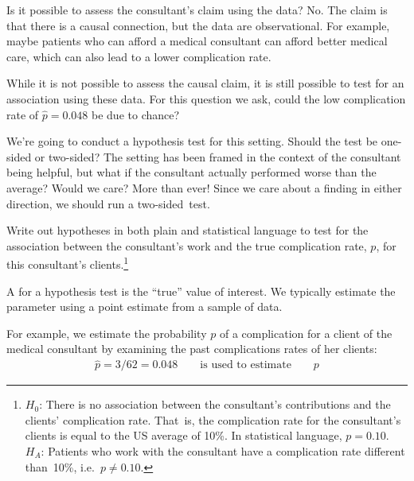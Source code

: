 \begin{example}{Is it possible to assess the consultant's claim using the data?}
No. The claim is that there is a causal connection, but the data are observational. For example, maybe patients who can afford a medical consultant can afford better medical care, which can also lead to a lower complication rate.

While it is not possible to assess the causal claim, it is still possible to test for an association using these data. For this question we ask, could the low complication rate of $\hat{p} = 0.048$ be due to chance?
\end{example}

\begin{example}{We're going to conduct a hypothesis test for this setting. Should the test be one-sided or two-sided?}
The setting has been framed in the context of the consultant being helpful, but what if the consultant actually performed worse than the average? Would we care? More than ever! Since we care about a finding in either direction, we should run a two-sided~test.
\end{example}

\begin{exercise}\label{hypForAssessingConsultantWorkInLiverTransplants}
Write out hypotheses in both plain and statistical language to test for the association between the consultant's work and the true complication rate, $p$, for this consultant's clients.\footnote{$H_0$: There is no association between the consultant's contributions and the clients' complication rate. That~is, the complication rate for the consultant's clients is equal to the US average of 10\%. In statistical language, $p=0.10$. $H_A$: Patients who work with the consultant have a complication rate different than~10\%, i.e.~$p \neq 0.10$.}
\end{exercise}

\begin{termBox}{
A  for a hypothesis test is the ``true'' value of interest. We typically estimate the parameter using a point estimate from a sample of data. \vspace{3mm}

For example, we estimate the probability $p$ of a complication for a client of the medical consultant by examining the past complications rates of her clients:\vspace{-2mm}
\begin{align*}
\hat{p} = 3 / 62 = 0.048\qquad\text{is used to estimate}\qquad p
\end{align*}}
\end{termBox}

